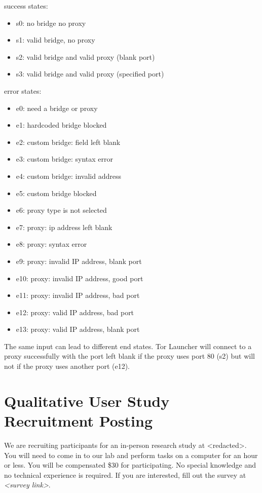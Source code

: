 \documentclass[USenglish,oneside,twocolumn]{article}
\begin{document}
\noindent success states: 
\begin{itemize}
\item s0: no bridge no proxy
\item s1: valid bridge, no proxy
\item s2: valid bridge and valid proxy (blank port)
\item s3: valid bridge and valid proxy (specified port)
\end{itemize}

error states:
\begin{itemize} 
\item e0: need a bridge or proxy
\item e1: hardcoded bridge blocked
\item e2: custom bridge: field left blank
\item e3: custom bridge: syntax error
\item e4: custom bridge: invalid address
\item e5: custom bridge blocked
\item e6: proxy type is not selected
\item e7: proxy: ip address left blank
\item e8: proxy: syntax error
\item e9: proxy: invalid IP address, blank port
\item e10: proxy: invalid IP address, good port
\item e11: proxy: invalid IP address, bad port
\item e12: proxy: valid IP address, bad port
\item e13: proxy: valid IP address, blank port
\end{itemize} 

The same input can lead to different end states. Tor Launcher will connect to a proxy successfully with the port left blank if the proxy uses port 80 (s2) but will not if the proxy uses another port (e12). 

\section{Qualitative User Study Recruitment Posting} 
\label{qualitative-recruitment}
We are recruiting participants for an in-person research study at <redacted>. %
You will need to come in to our lab and perform tasks on a computer for an hour or less. You will be compensated \$30 for participating. 
No special knowledge and no technical experience is required. If you are interested, fill out the survey at \textit{<survey link>}. 
\end{document}
